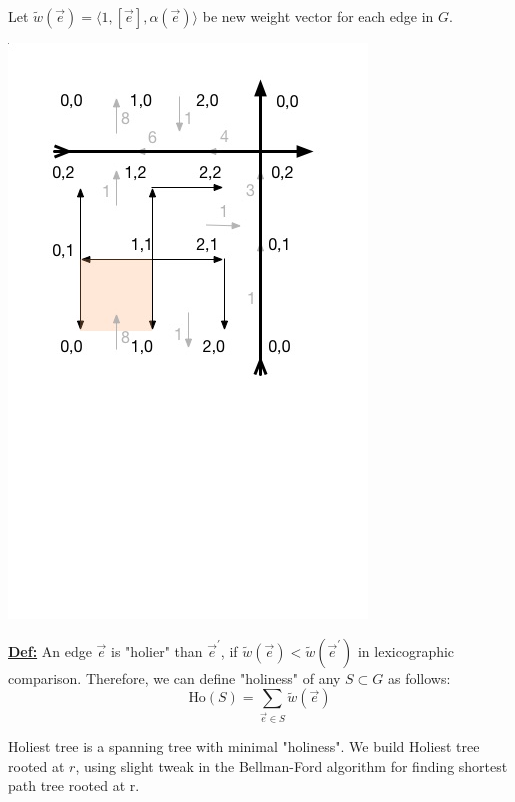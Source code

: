 \documentclass{article}
\begin{document}
Let $\tilde w(\vec{e}) = \langle 1, [\vec{e}], \alpha(\vec{e}) \rangle$ be new
weight vector for each edge in $G$.
\begin{center}
\includegraphics[scale = 0.5]{g1.jpg}
\end{center}

\textbf{\underline{Def:}} An edge $\vec{e}$ is "holier" than $\vec{e}^{'}$, 
if $\tilde w(\vec{e}) < \tilde w(\vec{e}^{'})$ in lexicographic comparison. 
Therefore, we can define "holiness" of any $S \subset G $ as follows:
\[\text{Ho}(S) = \sum \limits_{\vec{e} \in S} \tilde w(\vec{e})\]



\newpage

Holiest tree is a spanning tree with minimal "holiness". We build Holiest tree 
rooted at $r$, using slight tweak in the Bellman-Ford algorithm for finding 
shortest path tree rooted at r. \\
\end{document}
